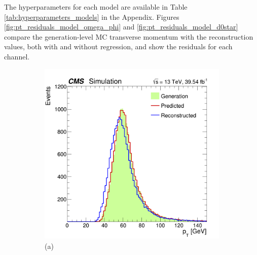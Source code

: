 The hyperparameters for each model are available in Table \ref{tab:hyperparameters_models} in the Appendix. Figures \ref{fig:pt_residuals_model_omega_phi} and \ref{fig:pt_residuals_model_d0star} compare the generation-level MC transverse momentum with the reconstruction values, both with and without regression, and show the residuals for each channel.
\begin{figure}[!ht]
    \captionsetup[subfigure]{labelformat=empty}
    \vspace*{-0.2cm}
    \centering
    \setlength{\mylength}{\textwidth}
    \begin{subfigure}[t]{0.50\mylength}
        \centering
        \includegraphics[width=0.49\mylength]{resources/plots/Phi3_model_pt.png}
        \vspace*{-0.2cm}
        \caption{\footnotesize (a)}
    \end{subfigure}%
    \begin{subfigure}[t]{0.50\mylength}
        \centering

\end{subfigure}
\end{figure}
